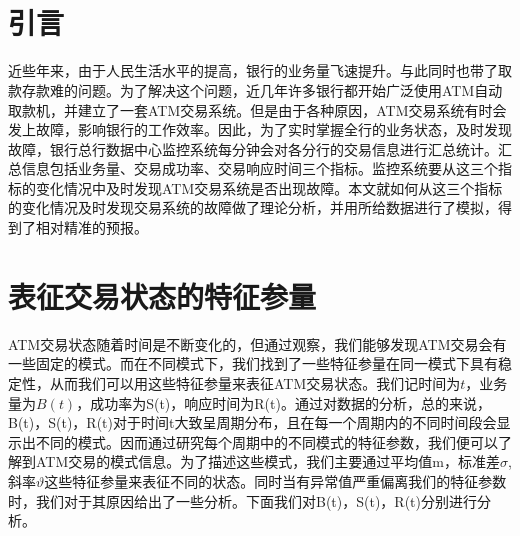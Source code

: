 \documentclass[a4paper]{article}
\begin{document}
\begin{titlepage}

%

\end{titlepage}

\begin{large}
	\begin{flushright}
		
	\end{flushright}
\end{large}
\ \ \\\\

\begin{abstract}
\textit{}
\end{abstract}

\newpage

\tableofcontents

\newpage

\part{引言}
近些年来，由于人民生活水平的提高，银行的业务量飞速提升。与此同时也带了取款存款难的问题。为了解决这个问题，近几年许多银行都开始广泛使用ATM自动取款机，并建立了一套ATM交易系统。但是由于各种原因，ATM交易系统有时会发上故障，影响银行的工作效率。因此，为了实时掌握全行的业务状态，及时发现故障，银行总行数据中心监控系统每分钟会对各分行的交易信息进行汇总统计。汇总信息包括业务量、交易成功率、交易响应时间三个指标。监控系统要从这三个指标的变化情况中及时发现ATM交易系统是否出现故障。本文就如何从这三个指标的变化情况及时发现交易系统的故障做了理论分析，并用所给数据进行了模拟，得到了相对精准的预报。

\part{表征交易状态的特征参量}
ATM交易状态随着时间是不断变化的，但通过观察，我们能够发现ATM交易会有一些固定的模式。而在不同模式下，我们找到了一些特征参量在同一模式下具有稳定性，从而我们可以用这些特征参量来表征ATM交易状态。我们记时间为$t$，业务量为$B(t)$，成功率为S(t)，响应时间为R(t)。通过对数据的分析，总的来说，B(t)，S(t)，R(t)对于时间t大致呈周期分布，且在每一个周期内的不同时间段会显示出不同的模式。因而通过研究每个周期中的不同模式的特征参数，我们便可以了解到ATM交易的模式信息。为了描述这些模式，我们主要通过平均值m，标准差$\sigma$,斜率$\vartheta$这些特征参量来表征不同的状态。同时当有异常值严重偏离我们的特征参数时，我们对于其原因给出了一些分析。下面我们对B(t)，S(t)，R(t)分别进行分析。
\end{document}
